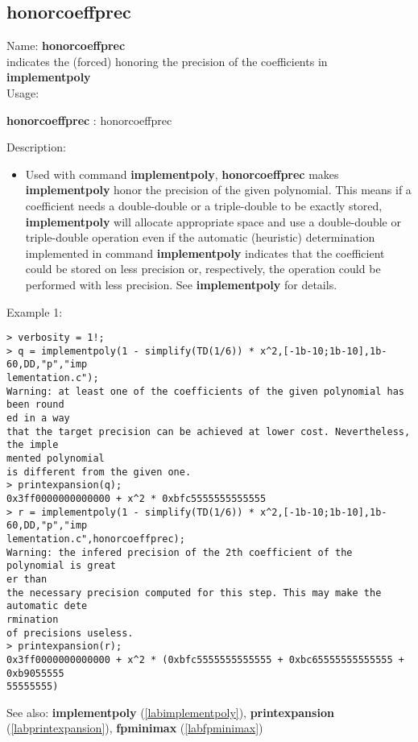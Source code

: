 \subsection{honorcoeffprec}
\label{labhonorcoeffprec}
\noindent Name: \textbf{honorcoeffprec}\\
indicates the (forced) honoring the precision of the coefficients in \textbf{implementpoly}\\
\noindent Usage: 
\begin{center}
\textbf{honorcoeffprec} : \textsf{honorcoeffprec}\\
\end{center}
\noindent Description: \begin{itemize}

\item Used with command \textbf{implementpoly}, \textbf{honorcoeffprec} makes \textbf{implementpoly} honor
   the precision of the given polynomial. This means if a coefficient
   needs a double-double or a triple-double to be exactly stored,
   \textbf{implementpoly} will allocate appropriate space and use a double-double
   or triple-double operation even if the automatic (heuristic)
   determination implemented in command \textbf{implementpoly} indicates that the
   coefficient could be stored on less precision or, respectively, the
   operation could be performed with less precision. See \textbf{implementpoly}
   for details.
\end{itemize}
\noindent Example 1: 
\begin{center}\begin{minipage}{15cm}\begin{Verbatim}[frame=single]
> verbosity = 1!;
> q = implementpoly(1 - simplify(TD(1/6)) * x^2,[-1b-10;1b-10],1b-60,DD,"p","imp
lementation.c");
Warning: at least one of the coefficients of the given polynomial has been round
ed in a way
that the target precision can be achieved at lower cost. Nevertheless, the imple
mented polynomial
is different from the given one.
> printexpansion(q);
0x3ff0000000000000 + x^2 * 0xbfc5555555555555
> r = implementpoly(1 - simplify(TD(1/6)) * x^2,[-1b-10;1b-10],1b-60,DD,"p","imp
lementation.c",honorcoeffprec);
Warning: the infered precision of the 2th coefficient of the polynomial is great
er than
the necessary precision computed for this step. This may make the automatic dete
rmination
of precisions useless.
> printexpansion(r);
0x3ff0000000000000 + x^2 * (0xbfc5555555555555 + 0xbc65555555555555 + 0xb9055555
55555555)
\end{Verbatim}
\end{minipage}\end{center}
See also: \textbf{implementpoly} (\ref{labimplementpoly}), \textbf{printexpansion} (\ref{labprintexpansion}), \textbf{fpminimax} (\ref{labfpminimax})
